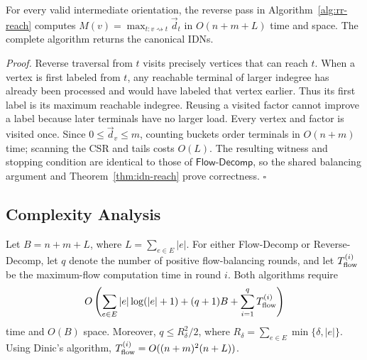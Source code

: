 \documentclass[twocolumn]{svjour3}
\newcommand{\kw}[1]{{\ensuremath{\mathsf{#1}}}\xspace}
\begin{document}
\begin{theorem}[Correctness of \kw{Reverse\text{-}Decomp}]\label{thm:rr-all}
For every valid intermediate orientation, the reverse pass in Algorithm~\ref{alg:rr-reach} computes $M(v)=\max_{t:v\rightsquigarrow t}\vec d_t$ in $O(n+m+L)$ time and space. The complete algorithm returns the canonical IDNs.
\end{theorem}
\emph{Proof.} Reverse traversal from $t$ visits precisely vertices that can reach $t$. When a vertex is first labeled from $t$, any reachable terminal of larger indegree has already been processed and would have labeled that vertex earlier. Thus its first label is its maximum reachable indegree. Reusing a visited factor cannot improve a label because later terminals have no larger load. Every vertex and factor is visited once. Since $0\le\vec d_v\le m$, counting buckets order terminals in $O(n+m)$ time; scanning the CSR and tails costs $O(L)$. The resulting witness and stopping condition are identical to those of \kw{Flow\text{-}Decomp}, so the shared balancing argument and Theorem~\ref{thm:idn-reach} prove correctness. \hfill$\square$

\subsection{Complexity Analysis}

\begin{theorem}
\label{thm:decomp-complexity}
Let $B=n+m+L$, where $L=\sum_{e\in E}|e|$.
For either Flow-Decomp or Reverse-Decomp, let $q$ denote
the number of positive flow-balancing rounds, and let
$T_{\rm flow}^{(i)}$ be the maximum-flow computation time
in round $i$. Both algorithms require
\[
O\left(
\sum_{e\in E}|e|\log(|e|+1)
+(q+1)B
+\sum_{i=1}^{q}T_{\rm flow}^{(i)}
\right)
\]
time and $O(B)$ space.
Moreover, $q\le R_\delta^2/2$, where
$R_\delta=\sum_{e\in E}\min\{\delta,|e|\}$.
Using Dinic's algorithm,
$T_{\rm flow}^{(i)}=O((n+m)^2(n+L))$.
\end{theorem}
\end{document}
